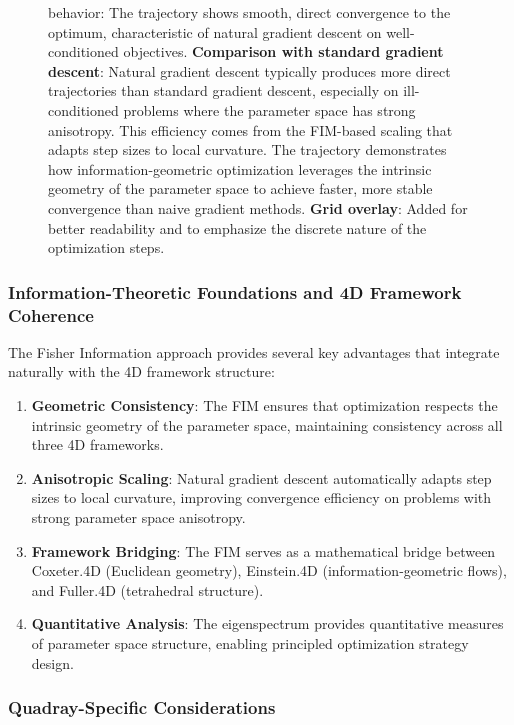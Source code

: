 \documentclass[
  10pt,
]{article}
\begin{document}
\begin{figure}
{{behavior}: The trajectory shows smooth, direct convergence to the
optimum, characteristic of natural gradient descent on well-conditioned
objectives. \textbf{Comparison with standard gradient descent}: Natural
gradient descent typically produces more direct trajectories than
standard gradient descent, especially on ill-conditioned problems where
the parameter space has strong anisotropy. This efficiency comes from
the FIM-based scaling that adapts step sizes to local curvature. The
trajectory demonstrates how information-geometric optimization leverages
the intrinsic geometry of the parameter space to achieve faster, more
stable convergence than naive gradient methods. \textbf{Grid overlay}:
Added for better readability and to emphasize the discrete nature of the
optimization steps.}
\end{figure}

\hypertarget{information-theoretic-foundations-and-4d-framework-coherence}{%
\subsubsection{Information-Theoretic Foundations and 4D Framework
Coherence}\label{information-theoretic-foundations-and-4d-framework-coherence}}

The Fisher Information approach provides several key advantages that
integrate naturally with the 4D framework structure:

\begin{enumerate}
\def\labelenumi{\arabic{enumi}.}
\item
  \textbf{Geometric Consistency}: The FIM ensures that optimization
  respects the intrinsic geometry of the parameter space, maintaining
  consistency across all three 4D frameworks.
\item
  \textbf{Anisotropic Scaling}: Natural gradient descent automatically
  adapts step sizes to local curvature, improving convergence efficiency
  on problems with strong parameter space anisotropy.
\item
  \textbf{Framework Bridging}: The FIM serves as a mathematical bridge
  between Coxeter.4D (Euclidean geometry), Einstein.4D
  (information-geometric flows), and Fuller.4D (tetrahedral structure).
\item
  \textbf{Quantitative Analysis}: The eigenspectrum provides
  quantitative measures of parameter space structure, enabling
  principled optimization strategy design.
\end{enumerate}

\hypertarget{quadray-specific-considerations}{%
\subsubsection{Quadray-Specific
Considerations}\label{quadray-specific-considerations}}
\end{document}
